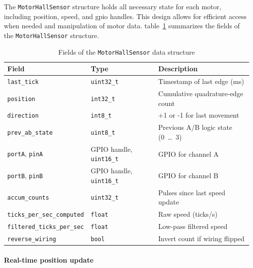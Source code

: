 The \texttt{MotorHallSensor} structure holds all necessary state for each motor, including position, speed, and \gls{gpio} handles. This design allows for efficient access when needed and manipulation of motor data. table~\ref{tab:motorhallsensor} summarizes the fields of the \texttt{MotorHallSensor} structure.
\begin{table}[H]
  \centering
  \begin{tabular}{@{}lll@{}}
    \toprule
    \textbf{Field}                     & \textbf{Type}                   & \textbf{Description}                  \\
    \midrule
    \texttt{last\_tick}                & \texttt{uint32\_t}              & Timestamp of last edge (ms)           \\
    \texttt{position}                  & \texttt{int32\_t}               & Cumulative quadrature-edge count      \\
    \texttt{direction}                 & \texttt{int8\_t}                & +1 or -1 for last movement            \\
    \texttt{prev\_ab\_state}           & \texttt{uint8\_t}               & Previous A/B logic state (0~\ldots~3) \\
    \texttt{portA}, \texttt{pinA}      & GPIO handle, \texttt{uint16\_t} & GPIO for channel A                    \\
    \texttt{portB}, \texttt{pinB}      & GPIO handle, \texttt{uint16\_t} & GPIO for channel B                    \\
    \texttt{accum\_counts}             & \texttt{uint32\_t}              & Pulses since last speed update        \\
    \texttt{ticks\_per\_sec\_computed} & \texttt{float}                  & Raw speed (ticks/s)                   \\
    \texttt{filtered\_ticks\_per\_sec} & \texttt{float}                  & Low-pass filtered speed               \\
    \texttt{reverse\_wiring}           & \texttt{bool}                   & Invert count if wiring flipped        \\
    \bottomrule
  \end{tabular}
  \caption{Fields of the \texttt{MotorHallSensor} data structure}
  \label{tab:motorhallsensor}
\end{table}



\paragraph*{Real-time position update}

